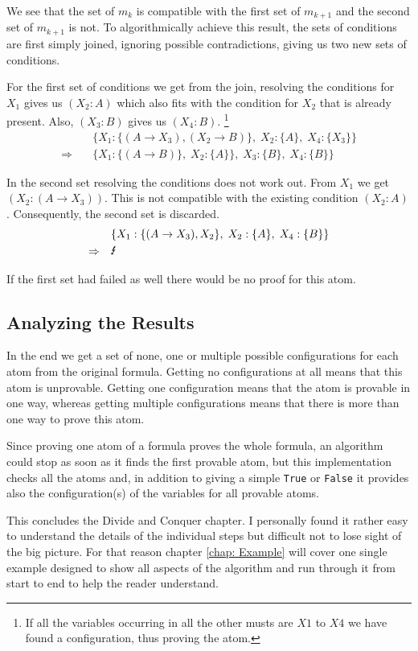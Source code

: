 We see that the set of $m_k$ is compatible with the first set of $m_{k+1}$ and the second set of $m_{k+1}$ is not. To algorithmically achieve this result, the sets of conditions are first simply joined, ignoring possible contradictions, giving us two new sets of conditions.

For the first set of conditions we get from the join, resolving the conditions for $X_1$ gives us $(X_2:A)$ which also fits with the condition for $X_2$ that is already present. Also, $(X_3: B)$ gives us $(X_4: B)$. \footnote{If all the variables occurring in all the other musts are $X1$ to $X4$ we have found a configuration, thus proving the atom.}
\begin{align*}
	& \{	X_1: \{(A \rightarrow X_3), (X_2 \rightarrow B)\},\;
						X_2: \{A\}, \;
						X_4: \{X_3\}\}\\
					\Rightarrow \quad & \{X_1: \{(A \rightarrow B)\},\; X_2: \{A\}\}, \;X_3: \{B\},\; X_4: \{B\}\}
\end{align*}

In the second set resolving the conditions does not work out. From $X_1$ we get $(X_2: (A \rightarrow X_3))$. This is not compatible with the existing condition $(X_2: A)$. Consequently, the second set is discarded. 
\begin{align*}
	& \{X_1: \{(A \rightarrow X_3), X_2\},\;
						X_2: \{A\}, \;
						X_4: \{B\}\} \\
					\Rightarrow \quad & \text{\Lightning} 
\end{align*}

If the first set had failed as well there would be no proof for this atom.

\subsection{Analyzing the Results}
In the end we get a set of none, one or multiple possible configurations for each atom from the original formula. Getting no configurations at all means that this atom is unprovable. Getting one configuration means that the atom is provable in one way, whereas getting multiple configurations means that there is more than one way to prove this atom.

Since proving one atom of a formula proves the whole formula, an algorithm could stop as soon as it finds the first provable atom, but this implementation checks all the atoms and, in addition to giving a simple \texttt{True} or \texttt{False} it provides also the configuration(s) of the variables for all provable atoms.


\bigskip
\par This concludes the Divide and Conquer chapter. I personally found it rather easy to understand the details of the individual steps but difficult not to lose sight of the big picture. For that reason chapter \ref{chap: Example} will cover one single example designed to show all aspects of the algorithm and run through it from start to end to help the reader understand.


